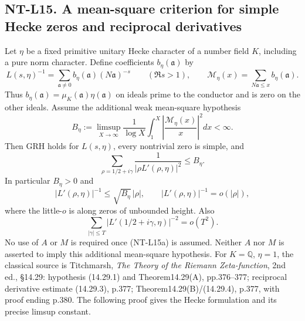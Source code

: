 \subsection*{NT-L15. A mean-square criterion for simple Hecke zeros and reciprocal derivatives}
Let $\eta$ be a fixed primitive unitary Hecke character of a number field $K$,
including a pure norm character. Define coefficients $b_\eta(\mathfrak a)$ by
\[
 L(s,\eta)^{-1}=\sum_{\mathfrak a\ne0}
       b_\eta(\mathfrak a)(N\mathfrak a)^{-s}
                    \qquad(\Re s>1),
 \qquad
 \mathcal M_\eta(x)=\sum_{N\mathfrak a\le x}b_\eta(\mathfrak a).
\]
Thus $b_\eta(\mathfrak a)=\mu_K(\mathfrak a)\eta(\mathfrak a)$
on ideals prime to the conductor and is zero on the other ideals.
Assume the additional weak mean-square hypothesis
\[
 B_\eta:=\limsup_{X\to\infty}\frac1{\log X}
       \int_1^X\left|\frac{\mathcal M_\eta(x)}x\right|^2dx<\infty.
                                                        \tag{NT-L15a}
\]
Then GRH holds for $L(s,\eta)$, every nontrivial zero is simple, and
\[
 \sum_{\rho=1/2+i\gamma}\frac1{|\rho L'(\rho,\eta)|^2}
                          \le B_\eta.                   \tag{NT-L15b}
\]
In particular $B_\eta>0$ and
\[
 |L'(\rho,\eta)|^{-1}\le\sqrt{B_\eta}\,|\rho|,
 \qquad |L'(\rho,\eta)|^{-1}=o(|\rho|),
                                                        \tag{NT-L15c}
\]
where the little-$o$ is along zeros of unbounded height. Also
\[
 \sum_{|\gamma|\le T}|L'(1/2+i\gamma,\eta)|^{-2}=o(T^2).
                                                        \tag{NT-L15d}
\]
No use of $A$ or $M$ is required once (NT-L15a) is assumed. Neither $A$ nor
$M$ is asserted to imply this additional mean-square hypothesis.
For $K=\mathbb Q$, $\eta=1$, the classical source is Titchmarsh,
\emph{The Theory of the Riemann Zeta-function}, 2nd ed.,
\S14.29: hypothesis (14.29.1) and Theorem14.29(A), pp.376--377;
reciprocal derivative estimate (14.29.3), p.377;
Theorem14.29(B)/(14.29.4), p.377, with proof ending p.380.
The following proof gives the Hecke formulation and its precise limsup constant.

